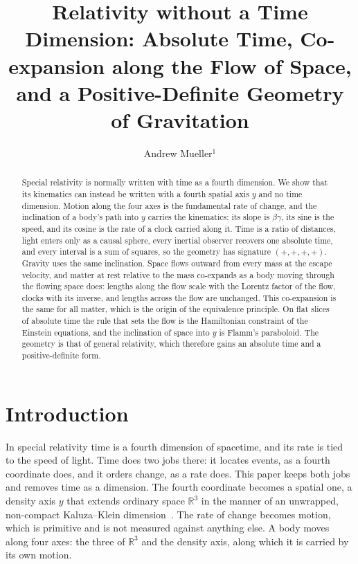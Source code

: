 \documentclass{iopjournal}
\begin{document}

\title{Relativity without a Time Dimension: Absolute Time, Co-expansion along the Flow of Space, and a Positive-Definite Geometry of Gravitation}

\author{Andrew Mueller$^1$}




\begin{abstract}
Special relativity is normally written with time as a fourth dimension. We show that its kinematics can instead be written with a fourth spatial axis $y$ and no time dimension. Motion along the four axes is the fundamental rate of change, and the inclination of a body's path into $y$ carries the kinematics: its slope is $\beta\gamma$, its sine is the speed, and its cosine is the rate of a clock carried along it. Time is a ratio of distances, light enters only as a causal sphere, every inertial observer recovers one absolute time, and every interval is a sum of squares, so the geometry has signature $(+,+,+,+)$. Gravity uses the same inclination. Space flows outward from every mass at the escape velocity, and matter at rest relative to the mass co-expands as a body moving through the flowing space does: lengths along the flow scale with the Lorentz factor of the flow, clocks with its inverse, and lengths across the flow are unchanged. This co-expansion is the same for all matter, which is the origin of the equivalence principle. On flat slices of absolute time the rule that sets the flow is the Hamiltonian constraint of the Einstein equations, and the inclination of space into $y$ is Flamm's paraboloid. The geometry is that of general relativity, which therefore gains an absolute time and a positive-definite form.
\end{abstract}

\section{Introduction}\label{sec1}

In special relativity time is a fourth dimension of spacetime, and its rate is tied to the speed of light. Time does two jobs there: it locates events, as a fourth coordinate does, and it orders change, as a rate does. This paper keeps both jobs and removes time as a dimension. The fourth coordinate becomes a spatial one, a density axis $y$ that extends ordinary space $\mathbb{R}^3$ in the manner of an unwrapped, non-compact Kaluza--Klein dimension~\cite{Kaluza1921, Klein1926}. The rate of change becomes motion, which is primitive and is not measured against anything else. A body moves along four axes: the three of $\mathbb{R}^3$ and the density axis, along which it is carried by its own motion.
\end{document}
